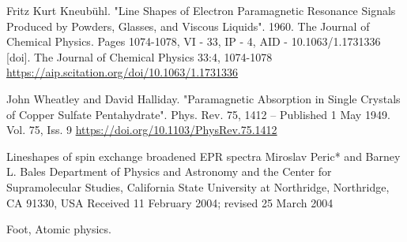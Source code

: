 \documentclass[openany,11pt,a4paper]{report}
\begin{document}
\begin{thebibliography}{99}

Fritz Kurt Kneubühl. "Line Shapes of Electron Paramagnetic Resonance Signals Produced by Powders, Glasses, and Viscous Liquids". 1960. The Journal of Chemical Physics. Pages 1074-1078, VI  - 33, IP  - 4, AID  - 10.1063/1.1731336 [doi].
 The Journal of Chemical Physics 33:4, 1074-1078
\url{https://aip.scitation.org/doi/10.1063/1.1731336}



John Wheatley and David Halliday. "Paramagnetic Absorption in Single Crystals of Copper Sulfate Pentahydrate". Phys. Rev. 75, 1412 – Published 1 May 1949. Vol. 75, Iss. 9
\url{https://doi.org/10.1103/PhysRev.75.1412}


  Lineshapes of spin exchange broadened EPR spectra
Miroslav Peric* and Barney L. Bales
Department of Physics and Astronomy and the Center for Supramolecular Studies, California State University at Northridge, Northridge,
CA 91330, USA
Received 11 February 2004; revised 25 March 2004

 Foot, Atomic physics.


\end{thebibliography}
\end{document}
